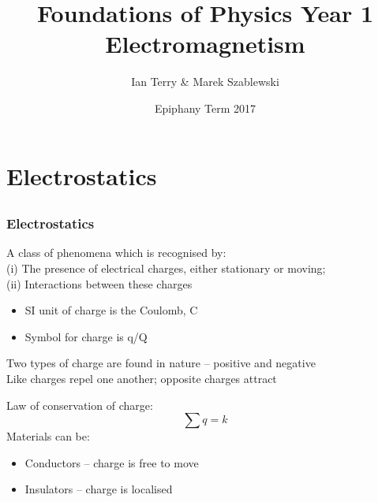 \documentclass[a4paper, 11pt, fleqn, normalem]{report}
\title{Foundations of Physics Year 1 \\ Electromagnetism \vspace{-20pt}}
\author{Ian Terry \& Marek Szablewski}
\date{\vspace{-15pt}Epiphany Term 2017}
\begin{document}
\maketitle
\thispagestyle{fancy}

\tableofcontents

\part{Electrostatics}
\chapter{}
\section{Electrostatics}
A class of phenomena which is recognised by: \\
(i) The presence of electrical charges, either stationary or moving; \\
(ii) Interactions between these charges
\begin{itemize}
    \item SI unit of charge is the Coulomb, C
    \item Symbol for charge is q/Q
\end{itemize}
Two types of charge are found in nature -- positive and negative \\
Like charges repel one another; opposite charges attract

Law of conservation of charge:
\begin{equation*}
    \sum q = k
\end{equation*}
Materials can be:
\begin{itemize}
    \item Conductors -- charge is free to move
    \item Insulators -- charge is localised
\end{itemize}
\end{document}
